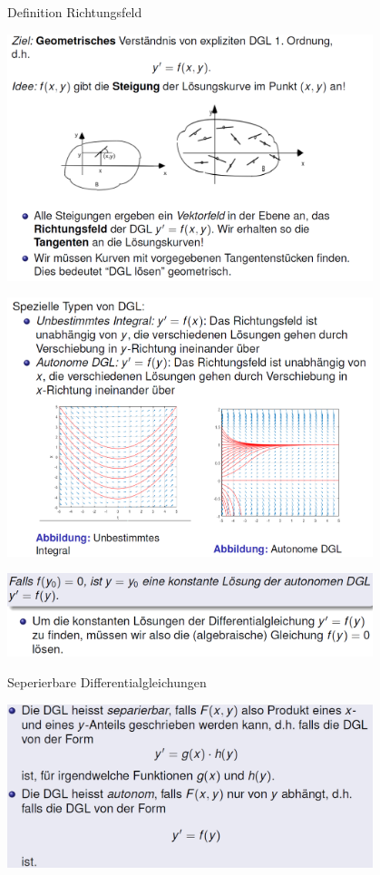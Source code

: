 \begin{definition}{Definition Richtungsfeld}
  \begin{center}
  \includegraphics[width=0.8\textwidth]{images/2024-06-02-22-06-02.png}
  \end{center}
  \begin{center}
  \includegraphics[width=0.8\textwidth]{images/2024-06-02-22-07-30.png}
  \end{center}
  \begin{center}
  \includegraphics[width=0.8\textwidth]{images/2024-06-02-22-08-12.png}
  \end{center}
\end{definition}
\begin{definition}{Seperierbare Differentialgleichungen}
  \begin{center}
  \includegraphics[width=0.8\textwidth]{images/2024-06-02-22-13-39.png}
  \end{center}
\end{definition}
